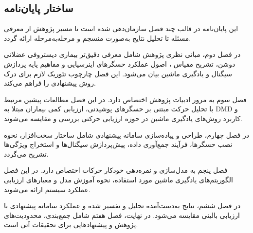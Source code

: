\subsection{ساختار پایان‌نامه}

این پایان‌نامه در قالب چند فصل سازمان‌دهی شده است تا مسیر پژوهش از معرفی مسئله تا تحلیل نتایج به‌صورت منسجم و مرحله‌به‌مرحله ارائه گردد.

در فصل دوم، مبانی نظری پژوهش شامل معرفی دقیق‌تر بیماری دیستروفی عضلانی دوشن، تشریح مقیاس ، اصول عملکرد حسگرهای اینرسیایی و مفاهیم پایه پردازش سیگنال و یادگیری ماشین بیان می‌شود. این فصل چارچوب تئوریک لازم برای درک روش پیشنهادی را فراهم می‌کند.

فصل سوم به مرور ادبیات پژوهش اختصاص دارد. در این فصل مطالعات پیشین مرتبط با تحلیل حرکت مبتنی بر حسگرهای پوشیدنی، ارزیابی کمی بیماران مبتلا به DMD و کاربرد روش‌های یادگیری ماشین در حوزه ارزیابی حرکتی بررسی و مقایسه می‌شوند.

در فصل چهارم، طراحی و پیاده‌سازی سامانه پیشنهادی شامل ساختار سخت‌افزار، نحوه نصب حسگرها، فرآیند جمع‌آوری داده، پیش‌پردازش سیگنال‌ها و استخراج ویژگی‌ها تشریح می‌گردد.

فصل پنجم به مدل‌سازی و نمره‌دهی خودکار حرکات اختصاص دارد. در این فصل الگوریتم‌های یادگیری ماشین مورد استفاده، نحوه آموزش مدل و معیارهای ارزیابی عملکرد سیستم ارائه می‌شوند.

در فصل ششم، نتایج به‌دست‌آمده تحلیل و تفسیر شده و عملکرد سامانه پیشنهادی با ارزیابی بالینی مقایسه می‌شود. در نهایت، فصل هفتم شامل جمع‌بندی، محدودیت‌های پژوهش و پیشنهادهایی برای تحقیقات آتی است.
